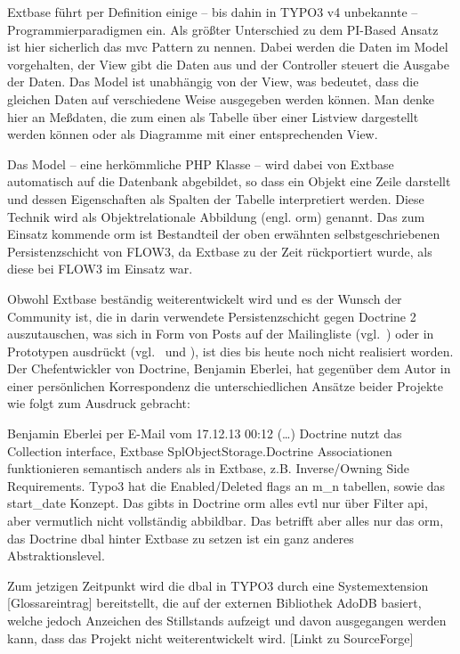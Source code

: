 Extbase führt per Definition einige – bis dahin in TYPO3 v4 unbekannte – Programmierparadigmen ein. Als größter Unterschied zu dem PI-Based Ansatz ist hier sicherlich das \gls{mvc} Pattern zu nennen. Dabei werden die Daten im Model vorgehalten, der View gibt die Daten aus und der Controller steuert die Ausgabe der Daten. Das Model ist unabhängig von der View, was bedeutet, dass die gleichen Daten auf verschiedene Weise ausgegeben werden können. Man denke hier an Meßdaten, die zum einen als Tabelle über einer Listview dargestellt werden können oder als Diagramme mit einer entsprechenden View.

Das Model – eine herkömmliche PHP Klasse – wird dabei von Extbase automatisch auf die Datenbank abgebildet, so dass ein Objekt eine Zeile darstellt und dessen Eigenschaften als Spalten der Tabelle interpretiert werden. Diese Technik wird als Objektrelationale Abbildung (engl. \gls{orm}) genannt. Das zum Einsatz kommende \gls{orm} ist Bestandteil der oben erwähnten selbstgeschriebenen Persistenzschicht von FLOW3, da Extbase zu der Zeit rückportiert wurde, als diese bei FLOW3 im Einsatz war.

Obwohl Extbase beständig weiterentwickelt wird und es der Wunsch der Community ist, die in darin verwendete Persistenzschicht gegen Doctrine 2 auszutauschen, was sich in Form von Posts auf der Mailingliste (vgl.~\cite{web:coreListIntegrateDoctrine2013}) oder in Prototypen ausdrückt (vgl.~\cite{web:maroschikWIP2012} und \cite{web:eberleiExtbaseDoctrineExtension2012}), ist dies bis heute noch nicht realisiert worden. Der Chefentwickler von Doctrine, Benjamin Eberlei, hat gegenüber dem Autor in einer persönlichen Korrespondenz die unterschiedlichen Ansätze beider Projekte wie folgt zum Ausdruck gebracht:
\begin{shadequote}{Benjamin Eberlei per E-Mail vom 17.12.13 00:12}
	(\ldots) Doctrine nutzt das Collection interface, Extbase SplObjectStorage.Doctrine Associationen funktionieren semantisch anders als in Extbase, z.B. Inverse/Owning Side Requirements.
	Typo3 hat die Enabled/Deleted flags an m\_n tabellen, sowie das start\_date Konzept. Das gibts in Doctrine \gls{orm} alles evtl nur über Filter \gls{api}, aber vermutlich nicht vollständig abbildbar.
	Das betrifft aber alles nur das \gls{orm}, das Doctrine \gls{dbal} hinter Extbase zu setzen ist ein ganz anderes Abstraktionslevel.
\end{shadequote}

Zum jetzigen Zeitpunkt wird die \gls{dbal} in TYPO3 durch eine Systemextension [Glossareintrag] bereitstellt, die auf der externen Bibliothek AdoDB basiert, welche jedoch Anzeichen des Stillstands aufzeigt und davon ausgegangen werden kann, dass das Projekt nicht weiterentwickelt wird. [Linkt zu SourceForge]

